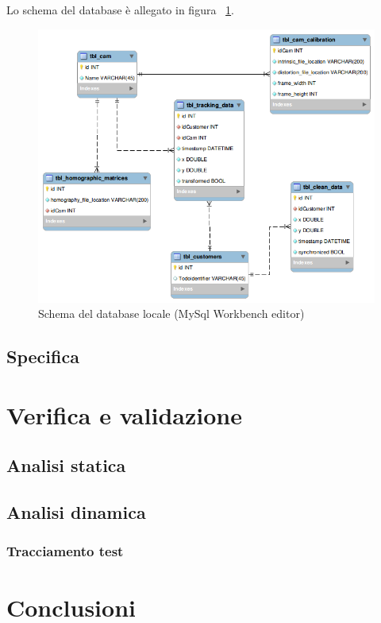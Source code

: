 \documentclass[a4paper,13pt,twoside]{article}
\begin{document}
Lo schema del database è allegato in figura ~\ref{fig:dbschema}.

\begin{figure}[!h]
\centering
\includegraphics[scale=0.5]{./images/dbschema.png}
\caption{Schema del database locale (MySql Workbench editor)}
\label{fig:dbschema}
\end{figure}

\newpage
\subsection{Specifica} \label{sec:specifica}

\newpage
\section{Verifica e validazione}
\subsection{Analisi statica}

\subsection{Analisi dinamica}

\subsubsection{Tracciamento test}
\newpage
\section{Conclusioni}
\newpage

%
%


%

\appendix
%
%
%
\end{document}
